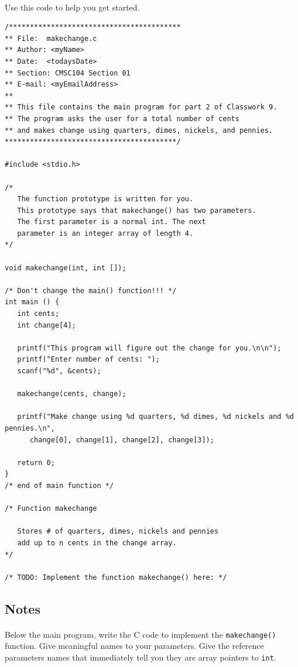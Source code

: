 \documentclass[letter,11pt]{article}
\begin{document}
\paragraph{}Use this code to help you get started.
\begin{verbatim}
/*****************************************
** File:  makechange.c
** Author: <myName>
** Date:  <todaysDate>
** Section: CMSC104 Section 01
** E-mail: <myEmailAddress>
**
** This file contains the main program for part 2 of Classwork 9.
** The program asks the user for a total number of cents
** and makes change using quarters, dimes, nickels, and pennies.
*****************************************/

#include <stdio.h>

/*
   The function prototype is written for you.
   This prototype says that makechange() has two parameters.
   The first parameter is a normal int. The next
   parameter is an integer array of length 4.
*/

void makechange(int, int []);

/* Don't change the main() function!!! */
int main () {
   int cents;
   int change[4];

   printf("This program will figure out the change for you.\n\n");
   printf("Enter number of cents: ");
   scanf("%d", &cents);

   makechange(cents, change);

   printf("Make change using %d quarters, %d dimes, %d nickels and %d pennies.\n",
      change[0], change[1], change[2], change[3]);

   return 0;
}
/* end of main function */

/* Function makechange
   
   Stores # of quarters, dimes, nickels and pennies
   add up to n cents in the change array.
*/

/* TODO: Implement the function makechange() here: */
\end{verbatim}

\subsection*{Notes}
\paragraph{}Below the main program, write the C code to implement the \texttt{makechange()} function. Give meaningful names to your parameters. Give the reference parameters names that immediately tell you they are array pointers to \texttt{int}.
\end{document}
